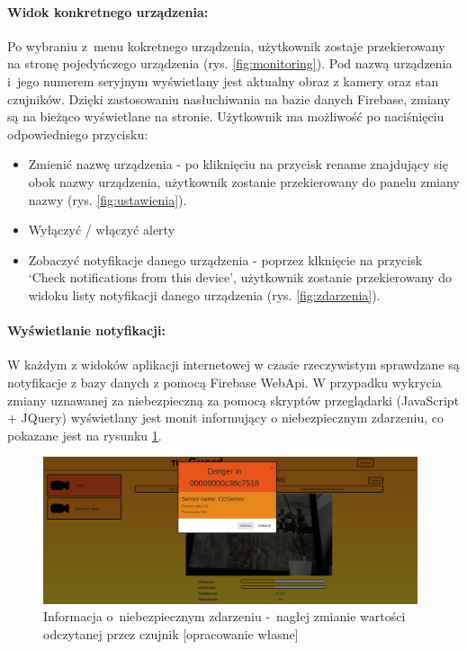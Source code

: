 \paragraph{Widok konkretnego urządzenia:} Po wybraniu z~menu kokretnego urządzenia, użytkownik zostaje przekierowany na stronę pojedyńczego urządzenia (rys. \ref{fig:monitoring}). Pod nazwą urządzenia i~jego numerem seryjnym wyświetlany jest aktualny obraz z kamery oraz stan czujników. Dzięki zastosowaniu nasłuchiwania na bazie danych Firebase, zmiany są na bieżąco wyświetlane na stronie. Użytkownik ma możliwość po naciśnięciu odpowiedniego przycisku:
\begin{itemize}
\item Zmienić nazwę urządzenia - po kliknięciu na przycisk rename znajdujący się obok nazwy urządzenia, użytkownik zostanie przekierowany do panelu zmiany nazwy (rys. \ref{fig:ustawienia}).
\item Wyłączyć / włączyć alerty 
\item Zobaczyć notyfikacje danego urządzenia - poprzez klknięcie na przycisk `Check notifications from this device', użytkownik zostanie przekierowany do widoku listy notyfikacji danego urządzenia (rys. \ref{fig:zdarzenia}).
\end{itemize}

\paragraph{Wyświetlanie notyfikacji:} W każdym z widoków aplikacji internetowej w czasie rzeczywistym sprawdzane są notyfikacje z bazy danych z pomocą Firebase WebApi. W przypadku wykrycia zmiany uznawanej za niebezpieczną za pomocą skryptów przeglądarki (JavaScript + JQuery) wyświetlany jest monit informujący o niebezpiecznym zdarzeniu, co pokazane jest na rysunku \ref{web_notification}.  

\begin{figure}[H]
	\centering
        \captionsetup{justification=centering, margin=1cm}
	\includegraphics[width=11cm]{web_screenshots/danger.png}
	\caption{Informacja o~niebezpiecznym zdarzeniu -~nagłej zmianie wartości odczytanej przez czujnik [opracowanie własne]}
	\label{web_notification}
\end{figure}
